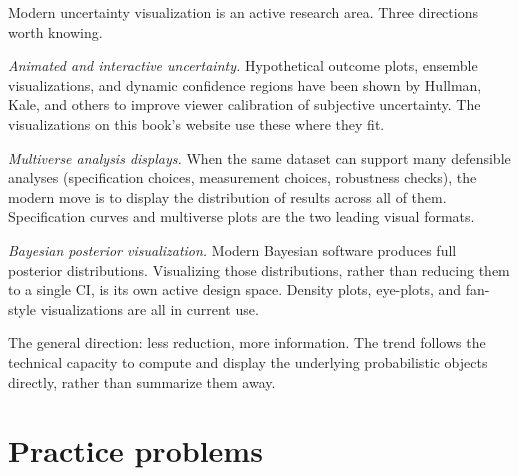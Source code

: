 \documentclass[
  letterpaper,
  11pt,
  twoside,
  openany]{scrbook}
\begin{document}
\begin{tcolorbox}[enhanced jigsaw, arc=.35mm, bottomrule=.15mm, bottomtitle=1mm, breakable, colback=white, colbacktitle=quarto-callout-important-color!10!white, colframe=quarto-callout-important-color-frame, coltitle=black, left=2mm, leftrule=.75mm, opacityback=0, opacitybacktitle=0.6, rightrule=.15mm, title=\textcolor{quarto-callout-important-color}{\faExclamation}\hspace{0.5em}{Frontier note}, titlerule=0mm, toprule=.15mm, toptitle=1mm]

Modern uncertainty visualization is an active research area. Three
directions worth knowing.

\emph{Animated and interactive uncertainty.} Hypothetical outcome plots,
ensemble visualizations, and dynamic confidence regions have been shown
by Hullman, Kale, and others to improve viewer calibration of subjective
uncertainty. The visualizations on this book's website use these where
they fit.

\emph{Multiverse analysis displays.} When the same dataset can support
many defensible analyses (specification choices, measurement choices,
robustness checks), the modern move is to display the distribution of
results across all of them. Specification curves and multiverse plots
are the two leading visual formats.

\emph{Bayesian posterior visualization.} Modern Bayesian software
produces full posterior distributions. Visualizing those distributions,
rather than reducing them to a single CI, is its own active design
space. Density plots, eye-plots, and fan-style visualizations are all in
current use.

The general direction: less reduction, more information. The trend
follows the technical capacity to compute and display the underlying
probabilistic objects directly, rather than summarize them away.

\end{tcolorbox}

\section{Practice problems}\label{practice-problems-7}
\end{document}
